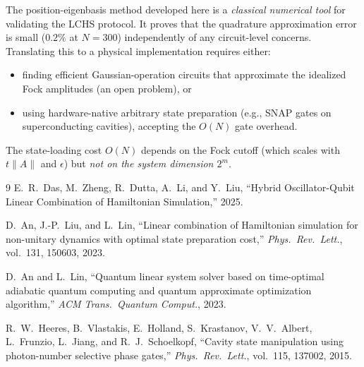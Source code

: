 \documentclass[11pt]{article}
\begin{document}
The position-eigenbasis method developed here is a \emph{classical
numerical tool} for validating the LCHS protocol.  It proves that the
quadrature approximation error is small ($0.2\%$ at $N=300$) independently
of any circuit-level concerns.  Translating this to a physical
implementation requires either:
\begin{itemize}
  \item finding efficient Gaussian-operation circuits that approximate the
        idealized Fock amplitudes (an open problem), or
  \item using hardware-native arbitrary state preparation (e.g., SNAP gates
        on superconducting cavities), accepting the $O(N)$ gate overhead.
\end{itemize}
The state-loading cost $O(N)$ depends on the Fock cutoff
(which scales with $t\|A\|$ and $\epsilon$) but \emph{not on the system
dimension $2^m$}.

\begin{thebibliography}{9}
E.~R.~Das, M.~Zheng, R.~Dutta, A.~Li, and Y.~Liu,
``Hybrid Oscillator-Qubit Linear Combination of Hamiltonian Simulation,''
2025.

D.~An, J.-P.~Liu, and L.~Lin,
``Linear combination of Hamiltonian simulation for non-unitary dynamics
with optimal state preparation cost,''
\textit{Phys.\ Rev.\ Lett.}, vol.~131, 150603, 2023.

D.~An and L.~Lin,
``Quantum linear system solver based on time-optimal adiabatic quantum
computing and quantum approximate optimization algorithm,''
\textit{ACM Trans.\ Quantum Comput.}, 2023.

R.~W.~Heeres, B.~Vlastakis, E.~Holland, S.~Krastanov, V.~V.~Albert,
L.~Frunzio, L.~Jiang, and R.~J.~Schoelkopf,
``Cavity state manipulation using photon-number selective phase gates,''
\textit{Phys.\ Rev.\ Lett.}, vol.~115, 137002, 2015.
\end{thebibliography}
\end{document}
